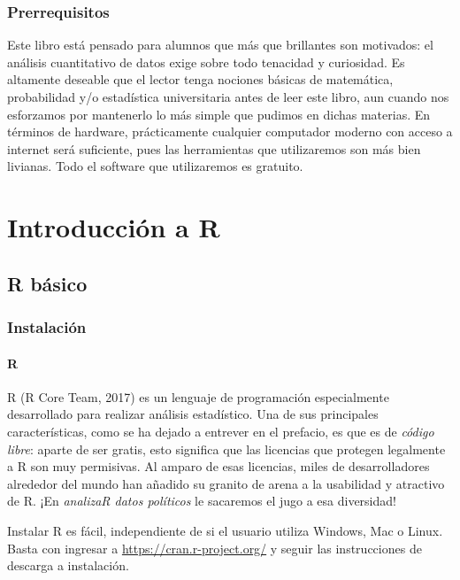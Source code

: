 \documentclass[]{book}
\begin{document}
\hypertarget{prerrequisitos}{%
\section{Prerrequisitos}\label{prerrequisitos}}

Este libro está pensado para alumnos que más que brillantes son
motivados: el análisis cuantitativo de datos exige sobre todo tenacidad
y curiosidad. Es altamente deseable que el lector tenga nociones básicas
de matemática, probabilidad y/o estadística universitaria antes de leer
este libro, aun cuando nos esforzamos por mantenerlo lo más simple que
pudimos en dichas materias. En términos de hardware, prácticamente
cualquier computador moderno con acceso a internet será suficiente, pues
las herramientas que utilizaremos son más bien livianas. Todo el
software que utilizaremos es gratuito.

\hypertarget{part-introduccion-a-r}{%
\part{Introducción a R}\label{part-introduccion-a-r}}

\hypertarget{rbas}{%
\chapter{R básico}\label{rbas}}

\hypertarget{instalacion}{%
\section{Instalación}\label{instalacion}}

\hypertarget{r}{%
\subsection{R}\label{r}}

R (R Core Team, 2017) es un lenguaje de programación especialmente
desarrollado para realizar análisis estadístico. Una de sus principales
características, como se ha dejado a entrever en el prefacio, es que es
de \emph{código libre}: aparte de ser gratis, esto significa que las
licencias que protegen legalmente a R son muy permisivas. Al amparo de
esas licencias, miles de desarrolladores alrededor del mundo han añadido
su granito de arena a la usabilidad y atractivo de R. ¡En \emph{analizaR
datos políticos} le sacaremos el jugo a esa diversidad!

Instalar R es fácil, independiente de si el usuario utiliza Windows, Mac
o Linux. Basta con ingresar a \url{https://cran.r-project.org/} y seguir
las instrucciones de descarga a instalación.
\end{document}
